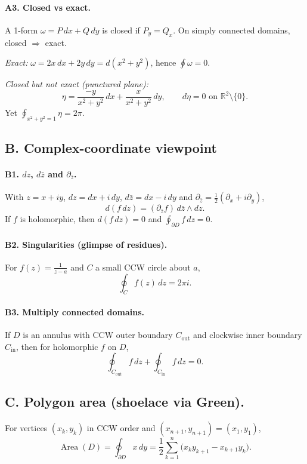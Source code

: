 \documentclass[11pt]{article}
\begin{document}
\paragraph{A3. Closed vs exact.}
A 1-form $\omega=P\,dx+Q\,dy$ is closed if $P_y=Q_x$. On simply connected domains, closed $\Rightarrow$ exact.

\emph{Exact:} $\omega=2x\,dx+2y\,dy=d(x^2+y^2)$, hence $\oint\omega=0$.

\emph{Closed but not exact (punctured plane):}
\[
\eta=\frac{-y}{x^2+y^2}\,dx+\frac{x}{x^2+y^2}\,dy,\qquad d\eta=0 \text{ on }\mathbb R^2\!\setminus\!\{0\}.
\]
Yet $\displaystyle \oint_{x^2+y^2=1} \eta = 2\pi$.

\subsection*{B. Complex-coordinate viewpoint}

\paragraph{B1. $dz$, $d\bar z$ and $\partial_{\bar z}$.}
With $z=x+iy$, $dz=dx+i\,dy$, $d\bar z=dx-i\,dy$ and $\partial_{\bar z}=\tfrac12(\partial_x+i\partial_y)$,
\[
d(f\,dz)=(\partial_{\bar z}f)\,d\bar z\wedge dz.
\]
If $f$ is holomorphic, then $d(f\,dz)=0$ and $\oint_{\partial D} f\,dz=0$.

\paragraph{B2. Singularities (glimpse of residues).}
For $f(z)=\frac{1}{z-a}$ and $C$ a small CCW circle about $a$,
\[
\oint_C f(z)\,dz=2\pi i.
\]

\paragraph{B3. Multiply connected domains.}
If $D$ is an annulus with CCW outer boundary $C_{\mathrm{out}}$ and clockwise inner boundary $C_{\mathrm{in}}$,
then for holomorphic $f$ on $D$,
\[
\oint_{C_{\mathrm{out}}} f\,dz+\oint_{C_{\mathrm{in}}} f\,dz=0.
\]

\subsection*{C. Polygon area (shoelace via Green).}
For vertices $(x_k,y_k)$ in CCW order and $(x_{n+1},y_{n+1})=(x_1,y_1)$,
\[
\operatorname{Area}(D)=\oint_{\partial D} x\,dy
=\frac12\sum_{k=1}^n \big(x_k y_{k+1}-x_{k+1}y_k\big).
\]
\end{document}
